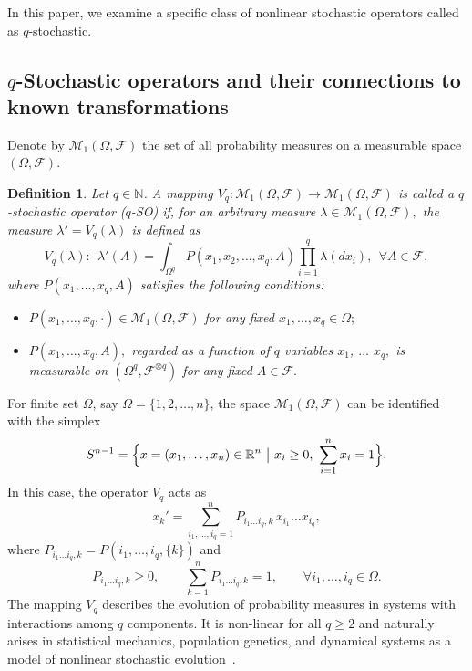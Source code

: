 \documentclass[11pt,reqno]{amsart}
\newtheorem{defn}{Definition}
\numberwithin{equation}{section} \setcounter{tocdepth}{1}
\def\l{\lambda}
\begin{document}
In this paper, we examine a specific class of nonlinear stochastic 
operators called as $q$-stochastic.

\subsection{$q$-Stochastic operators and their connections to known transformations}

Denote by $\mathcal{M}_1(\Omega, {\mathcal F})$ the set of all probability measures on a measurable space $(\Omega, {\mathcal F})$. 

\begin{defn}\label{gd1} Let $q\in \mathbb N$. A mapping $V_q : \mathcal M_1(\Omega,{ \mathcal F})\to \mathcal M_1(\Omega, { \mathcal F})$ is called a $q$-stochastic operator ($q$-SO) if, for an arbitrary measure $\l\in \mathcal M_1(\Omega,{ \mathcal F}),$ the measure $\l'=V_q(\l)$ is defined as 
\begin{equation}\label{Vq} V_q(\l): \ \ \l'(A)=\int_{\Omega^q} P(x_1,x_2,\dots, x_q, A)\prod_{i=1}^q\l(dx_i), \ \ \forall A\in { \mathcal F}, \end{equation} 
where $P(x_1, \dots, x_q, A)$ satisfies the following conditions: 
\begin{itemize}
\item[(i)] $P(x_1, \dots, x_q,\cdot)\in \mathcal M_1(\Omega,{ \mathcal F})$ for any fixed $x_1, \dots, x_q \in \Omega;$ 

\item[(ii)] $P(x_1, \dots, x_q, A),$ regarded as a function of $q$ variables $x_1$, $\dots$ $x_q,$ is measurable on $(\Omega^q, { \mathcal F^{\otimes q}})$ for any fixed $A\in { \mathcal F}.$ 
\end{itemize}
\end{defn}

For finite set $\Omega$, say $\Omega = \{1, 2, \dots, n\}$, the space $\mathcal{M}_1(\Omega, {\mathcal F})$ can be identified with the simplex 
$$
S^{n-1} = \Bigl\{ x = (x_1, \dots, x_n) \in \mathbb{R}^n \ \big|\ x_i \ge 0, \ \sum_{i=1}^n x_i = 1 \Bigr\}.
$$
In this case, the operator $V_q$ acts as
\begin{equation}\label{eq:discreteVq}
x_k' = \sum_{i_1, \dots, i_q = 1}^n P_{i_1 \dots i_q, k}\, x_{i_1} \dots x_{i_q},
\end{equation}
where $P_{i_1 \dots i_q, k} = P(i_1, \dots, i_q, \{k\})$ and
\begin{equation}\label{eq:coeff}
P_{i_1 \dots i_q, k} \ge 0, 
\qquad 
\sum_{k=1}^n P_{i_1 \dots i_q, k} = 1, 
\qquad 
\forall i_1, \dots, i_q \in \Omega.
\end{equation}
The mapping $V_q$ describes the evolution of probability measures in systems with interactions among $q$ components. It is non-linear for all $q \ge 2$ and naturally arises in statistical mechanics, population genetics, and dynamical systems as a model of nonlinear stochastic evolution~\cite{Bernstein1924, Ly, Rpd}. 
\end{document}
